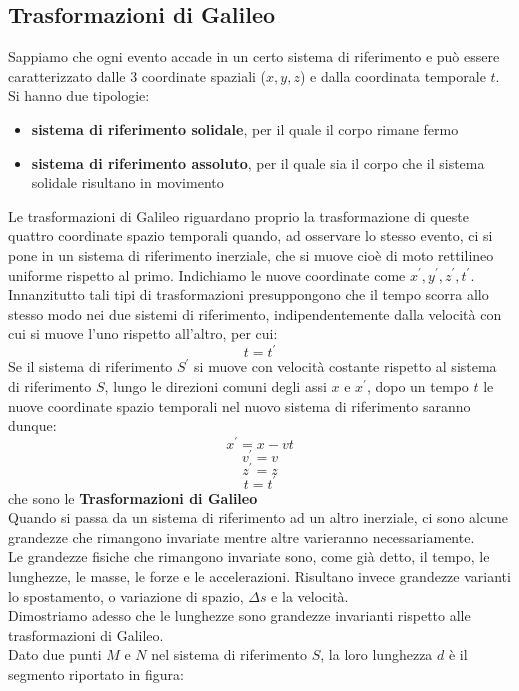 \documentclass[a4paper,12pt, oneside]{book}
\begin{document}
\subsection{Trasformazioni di Galileo}
Sappiamo che ogni evento accade in un certo sistema di riferimento e può essere caratterizzato dalle 3 coordinate spaziali ($x,y,z$) e dalla coordinata temporale $t$. Si hanno due tipologie:
\begin{itemize}
\item \textbf{sistema di riferimento solidale}, per il quale il corpo rimane fermo
\item \textbf{sistema di riferimento assoluto}, per il quale sia il corpo che il sistema solidale risultano in movimento
\end{itemize}
Le trasformazioni di Galileo riguardano proprio la trasformazione di queste quattro coordinate spazio temporali quando, ad osservare lo stesso evento, ci si pone in un sistema di riferimento inerziale, che si muove cioè di moto rettilineo uniforme rispetto al primo. Indichiamo le nuove coordinate come $x^{'},y^{'},z^{'},t^{'}$. Innanzitutto tali tipi di trasformazioni presuppongono che il tempo scorra allo stesso modo nei due sistemi di riferimento, indipendentemente dalla velocità con cui si muove l’uno rispetto all’altro, per cui:
$$t=t^{'}$$
Se il sistema di riferimento $S^{'}$ si muove con velocità costante rispetto al sistema di riferimento $S$, lungo le direzioni comuni degli assi $x$ e $x^{'}$, dopo un tempo $t$ le nuove coordinate spazio temporali nel nuovo sistema di riferimento saranno dunque:
$$x^{'}=x-vt$$
$$v^{'}=v$$
$$z^{'}=z$$
$$t=t^{'}$$
che sono le \textbf{Trasformazioni di Galileo}\\
Quando si passa da un sistema di riferimento ad un altro inerziale, ci sono alcune grandezze che rimangono invariate mentre altre varieranno necessariamente.\\
Le grandezze fisiche che rimangono invariate sono, come già detto, il tempo, le lunghezze, le masse, le forze e le accelerazioni.
Risultano invece grandezze varianti lo spostamento, o variazione di spazio, $\Delta s$ e la velocità.\\
Dimostriamo adesso che le lunghezze sono grandezze invarianti rispetto alle trasformazioni di Galileo.
\\
Dato due punti $M$ e $N$ nel sistema di riferimento $S$, la loro lunghezza $d$ è il segmento riportato in figura:
\end{document}
